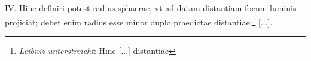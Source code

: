 \pend \pstart [p.~87] IV. Hinc definiri potest radius\protect{} sphaerae, vt ad datam  distantiam focum\protect{} luminis\protect{} projiciat; debet enim radius\protect{}  esse minor duplo praedictae distantiae;\footnote{\textit{Leibniz unterstreicht}: Hinc [...] distantiae} [...]. 